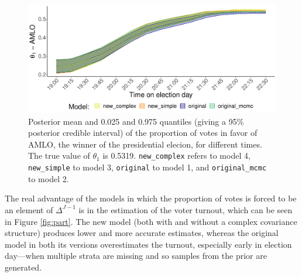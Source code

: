 \documentclass{article}
\begin{document}
\begin{figure}[h]
  \centering
  \includegraphics[width=\textwidth]{../fig/amlo2.pdf}
  \caption{Posterior mean and 0.025 and 0.975 quantiles (giving a 95\% posterior credible interval) of the proportion of votes in favor of AMLO, the winner of the presidential elecion, for different times. The true value of $\theta_1$ is 0.5319. \texttt{new\_complex} refers to model 4, \texttt{new\_simple} to model 3, \texttt{original} to model 1, and \texttt{original\_mcmc} to model 2.}
  \label{fig:amlo}
\end{figure}




The real advantage of the models in which the proportion of votes is forced to be an element of $\Delta^{J-1}$ is in the estimation of the voter turnout, which can be seen in Figure \ref{fig:part}. The new model (both with and without a complex covariance structure) produces lower and more accurate estimates, whereas the original model in both its versions overestimates the turnout, especially early in election day---when multiple strata are missing and so samples from the prior are generated. \\
\end{document}
